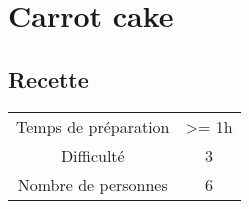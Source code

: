 \newpage
\section{Carrot cake}
    \label{sec:Carrot cake}
    \subsection{Recette}
    \vspace{1cm}


    \begin{center}
        \begin{tabular}{c|c}
            Temps de préparation & >= 1h \\
            Difficulté & 3 \\
            Nombre de personnes & 6 
        \end{tabular}
    \end{center}{}

    \vspace{1cm}
    \hline
    \vspace{1cm}

